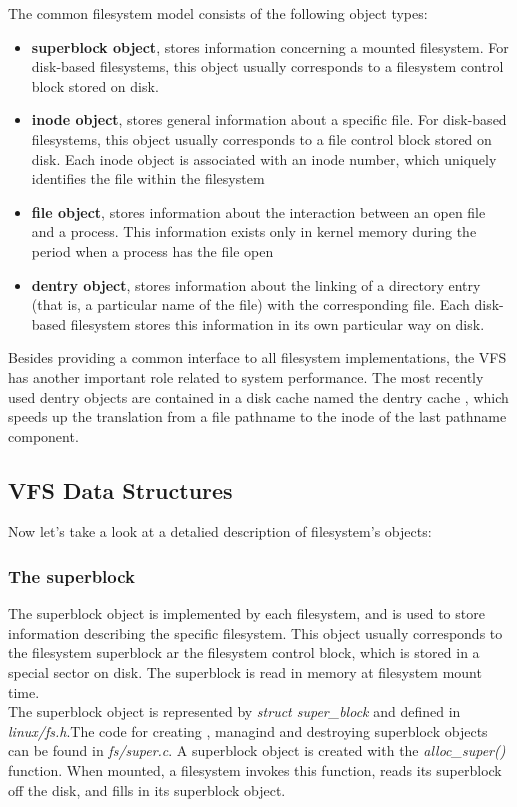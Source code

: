 \documentclass[conference]{IEEEtran}
\begin{document}
The common filesystem model consists of the following object types:
\begin{itemize}
\item
{\bf superblock object}, stores information concerning a mounted filesystem. For disk-based filesystems, 
this object usually corresponds to a filesystem control block stored on disk.
\item
{\bf inode object}, stores general information about a specific file. For disk-based filesystems, this object usually corresponds to a file control block stored on disk. Each inode object is associated with 
an inode number, which uniquely identifies the file within the filesystem
\item
{\bf file object}, stores information about the interaction between an open file and a process. This information 
exists only in kernel memory during the period when a process has the file open
\item 
{\bf dentry object}, stores information about the linking of a directory entry (that is, a particular name of the file) with the corresponding file. Each disk-based 
filesystem stores this information in its own particular way on disk.
\end{itemize}
Besides providing a common interface to all filesystem implementations, the VFS has another important role 
related to system performance. The most recently used dentry objects are contained in a disk cache named the 
dentry cache , which speeds up the translation from a file pathname to the inode of the last pathname component.
\subsection{VFS Data Structures}
Now let's take a look at a detalied description of filesystem's objects:
\subsubsection {The superblock} 
The superblock object is implemented by each filesystem, and is used to store information describing the 
specific filesystem. This object usually corresponds to the filesystem superblock ar the filesystem control 
block, which is stored in a special sector on disk. The superblock is read in memory at filesystem
mount time. \\

The superblock object is represented by {\em struct super\_block } and defined in {\em linux/fs.h}.The code for 
creating , managind and destroying superblock objects can be found in {\em fs/super.c}. A superblock
object is created with the {\em alloc\_super() } function. When mounted, a filesystem invokes this function,
reads its superblock off the disk, and fills in its superblock object. \\
\end{document}
